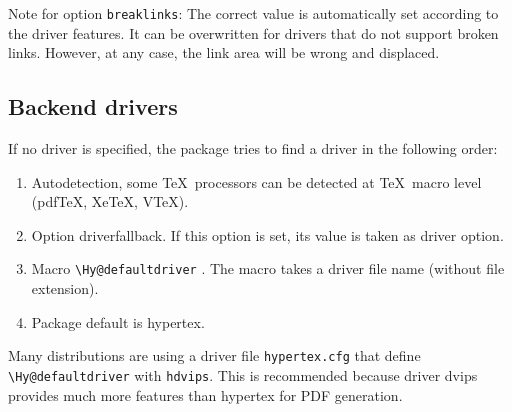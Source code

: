 \documentclass{article}
\newcommand*{\cs}[1]{%
  \texttt{\textbackslash #1}%
}
\begin{document}
Note for option \verb|breaklinks|:
The correct value is automatically set according to the driver features.
It can be overwritten for drivers that do not support broken links.
However, at any case, the link area will be wrong and displaced.

\subsection{Backend drivers}

If no driver is specified, the package tries to find a driver in
the following order:
\begin{enumerate}
\item Autodetection, some \TeX\ processors can be detected at \TeX\ macro
  level (pdf\TeX, Xe\TeX, V\TeX).
\item Option \textsf{driverfallback}. If this option is set, its value
  is taken as driver option.
\item Macro \cs{Hy@defaultdriver}. The macro takes a driver file
  name (without file extension).
\item Package default is \textsf{hypertex}.
\end{enumerate}
Many distributions are using a driver file \texttt{hypertex.cfg} that
define \cs{Hy@defaultdriver} with \texttt{hdvips}. This is recommended
because driver \textsf{dvips} provides much more features than
\textsf{hypertex} for PDF generation.
\end{document}
